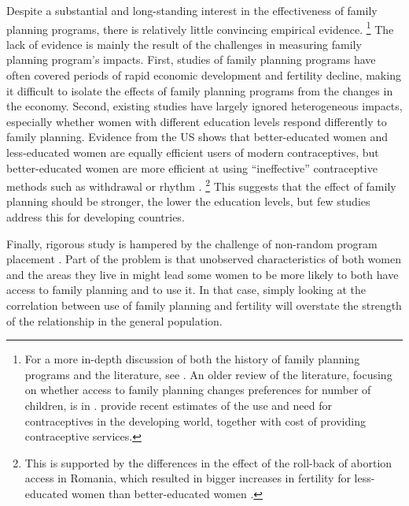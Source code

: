 \documentclass[letterpaper,12pt]{article}
\begin{document}
Despite a substantial and long-standing interest in the effectiveness of
family planning programs, there is relatively little convincing
empirical evidence.%
\footnote{
For a more in-depth discussion of both the history of family planning
programs and the literature, see \citet{Miller2016}.
An older review of the literature, focusing on whether access to family
planning changes preferences for number of children, is in
\citet{Freedman1997}.
\citet{Singh2012} provide recent estimates of the use and need for
contraceptives in the developing world, together with cost of providing
contraceptive services.}
The lack of evidence is mainly the result of the challenges in measuring
family planning program's impacts.
First, studies of family planning programs have often covered periods of
rapid economic development and fertility decline, making it difficult to
isolate the effects of family planning programs from the changes in the
economy.
Second, existing studies have largely ignored heterogeneous impacts,
especially whether women with different education levels respond
differently to family planning.
Evidence from the US shows that better-educated women and less-educated
women are equally efficient users of modern contraceptives, but
better-educated women are more efficient at using ``ineffective''
contraceptive methods such as withdrawal or rhythm
\citep{Rosenzweig1989}.%
\footnote{
This is supported by the differences in the effect of the roll-back
of abortion access in Romania, which resulted in bigger increases
in fertility for less-educated women than better-educated women 
\citep{Pop-Eleches2010}.
}
This suggests that the effect of family planning should be stronger, the
lower the education levels, but few studies address this for 
developing countries.


Finally, rigorous study is hampered by the challenge of non-random
program placement \citep{rosenzweig86,pitt93,Miller2016}.
Part of the problem is that unobserved characteristics of both women and
the areas they live in might lead some women to be more likely to both
have access to family planning and to use it.
In that case, simply looking at the correlation between use of family
planning and fertility will overstate the strength of the relationship
in the general population.
\end{document}
